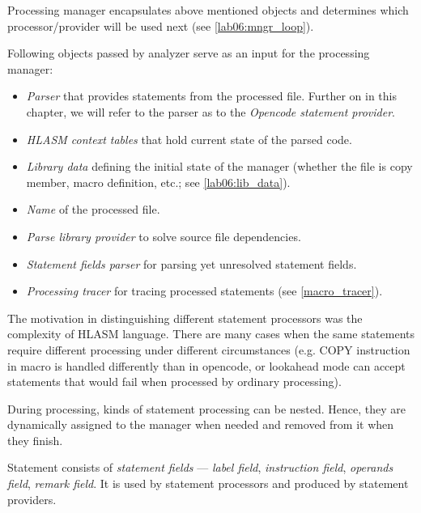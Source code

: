 Processing manager encapsulates above mentioned objects and determines which processor/provider will be used next (see \cref{lab06:mngr_loop}).

Following objects passed by analyzer serve as an input for the processing manager:
\begin{itemize}
	\item \emph{Parser} that provides statements from the processed file. Further on in this chapter, we will refer to the parser as to the \emph{Opencode statement provider}.
	\item \emph{HLASM context tables} that hold current state of the parsed code.
	\item \emph{Library data} defining the initial state of the manager (whether the file is copy member, macro definition, etc.; see \cref{lab06:lib_data}). 
	\item \emph{Name} of the processed file.
	\item \emph{Parse library provider} to solve source file dependencies.
	\item \emph{Statement fields parser} for parsing yet unresolved statement fields. 
	\item \emph{Processing tracer} for tracing processed statements (see \cref{macro_tracer}).
\end{itemize}

\label{lab06:sect_proc}



The motivation in distinguishing different statement processors was the complexity of HLASM language. There are many cases when the same statements require different processing under different circumstances (e.g. COPY instruction in macro is handled differently than in opencode, or lookahead mode can accept statements that would fail when processed by ordinary processing).

During processing, kinds of statement processing can be nested. Hence, they are dynamically assigned to the manager when needed and removed from it when they finish.

Statement consists of \emph{statement fields} --- \emph{label field}, \emph{instruction field}, \emph{operands field}, \emph{remark field}. It is used by statement processors and produced by statement providers. 


